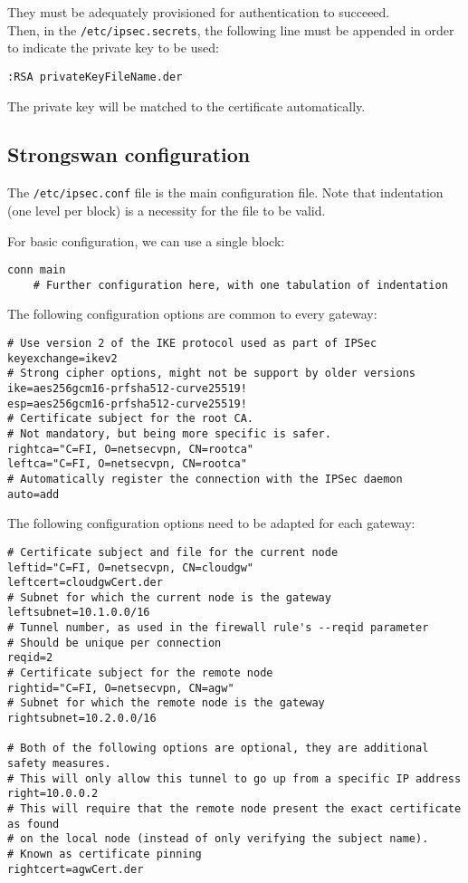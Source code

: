 \documentclass[paper=a4, fontsize=11pt]{scrartcl}
\begin{document}
They must be adequately provisioned for authentication to succeeed.\\

Then, in the \texttt{/etc/ipsec.secrets}, the following line must be appended in
order to indicate the private key to be used:

\texttt{:RSA privateKeyFileName.der}

The private key will be matched to the certificate automatically.

\subsection{Strongswan configuration}

The \texttt{/etc/ipsec.conf} file is the main configuration file.
Note that indentation (one level per block) is a necessity for the file to be
valid.

For basic configuration, we can use a single block:

\begin{lstlisting}
conn main
    # Further configuration here, with one tabulation of indentation
\end{lstlisting}

The following configuration options are common to every gateway:

\begin{verbatim}
# Use version 2 of the IKE protocol used as part of IPSec
keyexchange=ikev2
# Strong cipher options, might not be support by older versions
ike=aes256gcm16-prfsha512-curve25519!
esp=aes256gcm16-prfsha512-curve25519!
# Certificate subject for the root CA.
# Not mandatory, but being more specific is safer.
rightca="C=FI, O=netsecvpn, CN=rootca"
leftca="C=FI, O=netsecvpn, CN=rootca"
# Automatically register the connection with the IPSec daemon
auto=add
\end{verbatim}

The following configuration options need to be adapted for each gateway:
\begin{verbatim}
# Certificate subject and file for the current node
leftid="C=FI, O=netsecvpn, CN=cloudgw"
leftcert=cloudgwCert.der
# Subnet for which the current node is the gateway
leftsubnet=10.1.0.0/16
# Tunnel number, as used in the firewall rule's --reqid parameter
# Should be unique per connection
reqid=2
# Certificate subject for the remote node
rightid="C=FI, O=netsecvpn, CN=agw"
# Subnet for which the remote node is the gateway
rightsubnet=10.2.0.0/16

# Both of the following options are optional, they are additional safety measures.
# This will only allow this tunnel to go up from a specific IP address
right=10.0.0.2
# This will require that the remote node present the exact certificate as found
# on the local node (instead of only verifying the subject name).
# Known as certificate pinning
rightcert=agwCert.der
\end{verbatim}
\end{document}
